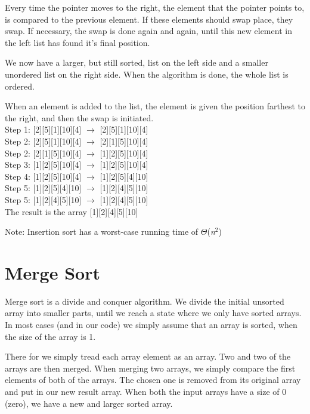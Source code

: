 \documentclass[12pt,a4paper]{article}
\begin{document}
Every time the pointer moves to the right, the element that the pointer points to, is compared to the previous element. If these elements should swap place, they swap. If necessary, the swap is done again and again, until this new element in the left list has found it's final position. 

We now have a larger, but still sorted, list on the left side and a smaller unordered list on the right side. When the algorithm is done, the whole list is ordered.

When an element is added to the list, the element is given the position farthest to the right, and then the swap is initiated.\\

\noindent
Step 1: {\color{blue}[2][5]}[1][10][4] $\rightarrow$ {\color{blue}[2][5]}[1][10][4]\\
\noindent
Step 2: [2]{\color{blue}[5][1]}[10][4] $\rightarrow$ [2]{\color{blue}[1][5]}[10][4]\\
\noindent
Step 2: {\color{blue}[2][1]}[5][10][4] $\rightarrow$ {\color{blue}[1][2]}[5][10][4]\\
\noindent
Step 3: [1][2]{\color{blue}[5][10]}[4] $\rightarrow$ [1][2]{\color{blue}[5][10]}[4]\\
\noindent
Step 4: [1][2][5]{\color{blue}[10][4]} $\rightarrow$ [1][2][5]{\color{blue}[4][10]}\\
\noindent
Step 5: [1][2]{\color{blue}[5][4]}[10] $\rightarrow$ [1][2]{\color{blue}[4][5]}[10]\\
\noindent
Step 5: [1]{\color{blue}[2][4]}[5][10] $\rightarrow$ [1]{\color{blue}[2][4]}[5][10]\\

\noindent
The result is the array [1][2][4][5][10]

\noindent
Note: Insertion sort has a worst-case running time of $\Theta$(\textit{n$^{2}$})

\clearpage

\section{Merge Sort}
Merge sort is a divide and conquer algorithm. We divide the initial unsorted array into smaller parts, until we reach a state where we only have sorted arrays. In most cases (and in our code) we simply assume that an array is sorted, when the size of the array is 1.

There for we simply tread each array element as an array. Two and two of the arrays are then merged. When merging two arrays, we simply compare the first elements of both of the arrays. The chosen one is removed from its original array and put in our new result array. When both the input arrays have a size of 0 (zero), we have a new and larger sorted array.\\
\end{document}

